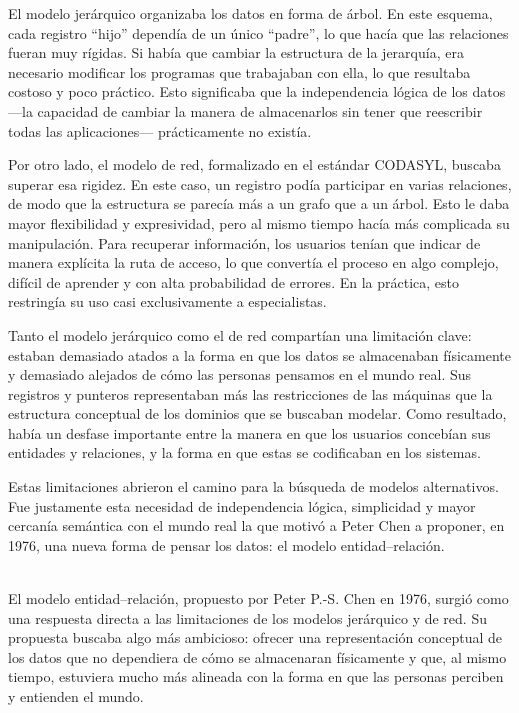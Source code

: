 \documentclass{article}
\begin{document}
El modelo jerárquico organizaba los datos en forma de árbol. En este esquema, cada registro “hijo” dependía de un único “padre”, lo que hacía que las relaciones fueran muy rígidas. Si había que cambiar la estructura de la jerarquía, era necesario modificar los programas que trabajaban con ella, lo que resultaba costoso y poco práctico. Esto significaba que la independencia lógica de los datos —la capacidad de cambiar la manera de almacenarlos sin tener que reescribir todas las aplicaciones— prácticamente no existía.

Por otro lado, el modelo de red, formalizado en el estándar CODASYL, buscaba superar esa rigidez. En este caso, un registro podía participar en varias relaciones, de modo que la estructura se parecía más a un grafo que a un árbol. Esto le daba mayor flexibilidad y expresividad, pero al mismo tiempo hacía más complicada su manipulación. Para recuperar información, los usuarios tenían que indicar de manera explícita la ruta de acceso, lo que convertía el proceso en algo complejo, difícil de aprender y con alta probabilidad de errores. En la práctica, esto restringía su uso casi exclusivamente a especialistas.

Tanto el modelo jerárquico como el de red compartían una limitación clave: estaban demasiado atados a la forma en que los datos se almacenaban físicamente y demasiado alejados de cómo las personas pensamos en el mundo real. Sus registros y punteros representaban más las restricciones de las máquinas que la estructura conceptual de los dominios que se buscaban modelar. Como resultado, había un desfase importante entre la manera en que los usuarios concebían sus entidades y relaciones, y la forma en que estas se codificaban en los sistemas.

Estas limitaciones abrieron el camino para la búsqueda de modelos alternativos. Fue justamente esta necesidad de independencia lógica, simplicidad y mayor cercanía semántica con el mundo real la que motivó a Peter Chen a proponer, en 1976, una nueva forma de pensar los datos: el modelo entidad–relación.

\\
El modelo entidad–relación, propuesto por Peter P.-S. Chen en 1976, surgió como una respuesta directa a las limitaciones de los modelos jerárquico y de red. Su propuesta buscaba algo más ambicioso: ofrecer una representación conceptual de los datos que no dependiera de cómo se almacenaran físicamente y que, al mismo tiempo, estuviera mucho más alineada con la forma en que las personas perciben y entienden el mundo.
\end{document}
